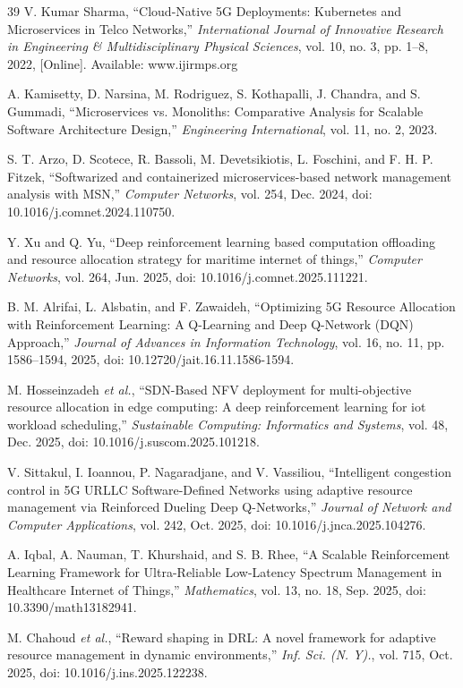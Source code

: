 \documentclass[conference]{IEEEtran}
\begin{document}
\begin{thebibliography}{39}
 V. Kumar Sharma, ``Cloud-Native 5G Deployments: Kubernetes and Microservices in Telco Networks,'' \emph{International Journal of Innovative Research in Engineering \& Multidisciplinary Physical Sciences}, vol. 10, no. 3, pp. 1--8, 2022, {[}Online{]}. Available: www.ijirmps.org

 A. Kamisetty, D. Narsina, M. Rodriguez, S. Kothapalli, J. Chandra, and S. Gummadi, ``Microservices vs. Monoliths: Comparative Analysis for Scalable Software Architecture Design,'' \emph{Engineering International}, vol. 11, no. 2, 2023.

 S. T. Arzo, D. Scotece, R. Bassoli, M. Devetsikiotis, L. Foschini, and F. H. P. Fitzek, ``Softwarized and containerized microservices-based network management analysis with MSN,'' \emph{Computer Networks}, vol. 254, Dec. 2024, doi: 10.1016/j.comnet.2024.110750.

 Y. Xu and Q. Yu, ``Deep reinforcement learning based computation offloading and resource allocation strategy for maritime internet of things,'' \emph{Computer Networks}, vol. 264, Jun. 2025, doi: 10.1016/j.comnet.2025.111221.

 B. M. Alrifai, L. Alsbatin, and F. Zawaideh, ``Optimizing 5G Resource Allocation with Reinforcement Learning: A Q-Learning and Deep Q-Network (DQN) Approach,'' \emph{Journal of Advances in Information Technology}, vol. 16, no. 11, pp. 1586--1594, 2025, doi: 10.12720/jait.16.11.1586-1594.

 M. Hosseinzadeh \emph{et al.}, ``SDN-Based NFV deployment for multi-objective resource allocation in edge computing: A deep reinforcement learning for iot workload scheduling,'' \emph{Sustainable Computing: Informatics and Systems}, vol. 48, Dec. 2025, doi: 10.1016/j.suscom.2025.101218.

 V. Sittakul, I. Ioannou, P. Nagaradjane, and V. Vassiliou, ``Intelligent congestion control in 5G URLLC Software-Defined Networks using adaptive resource management via Reinforced Dueling Deep Q-Networks,'' \emph{Journal of Network and Computer Applications}, vol. 242, Oct. 2025, doi: 10.1016/j.jnca.2025.104276.

 A. Iqbal, A. Nauman, T. Khurshaid, and S. B. Rhee, ``A Scalable Reinforcement Learning Framework for Ultra-Reliable Low-Latency Spectrum Management in Healthcare Internet of Things,'' \emph{Mathematics}, vol. 13, no. 18, Sep. 2025, doi: 10.3390/math13182941.

 M. Chahoud \emph{et al.}, ``Reward shaping in DRL: A novel framework for adaptive resource management in dynamic environments,'' \emph{Inf. Sci. (N. Y).}, vol. 715, Oct. 2025, doi: 10.1016/j.ins.2025.122238.


\end{thebibliography}
\end{document}
